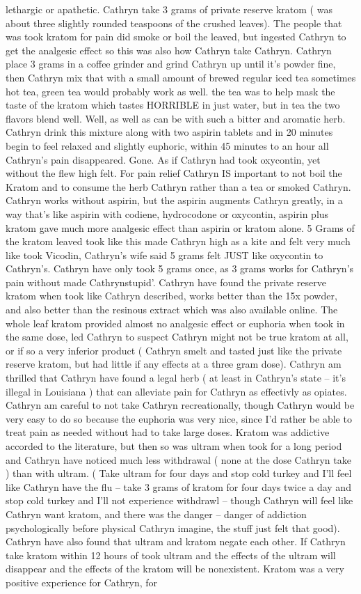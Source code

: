\documentclass[12pt]{book}
\begin{document}
lethargic or apathetic. Cathryn take 3 grams of private reserve kratom ( was about three slightly rounded teaspoons of the crushed leaves). The people that was took kratom for pain did smoke or boil the leaved, but ingested Cathryn to get the analgesic effect so this was also how Cathryn take Cathryn. Cathryn place 3 grams in a coffee grinder and grind Cathryn up until it's powder fine, then Cathryn mix that with a small amount of brewed regular iced tea sometimes hot tea, green tea would probably work as well. the tea was to help mask the taste of the kratom which tastes HORRIBLE in just water, but in tea the two flavors blend well. Well, as well as can be with such a bitter and aromatic herb. Cathryn drink this mixture along with two aspirin tablets and in 20 minutes begin to feel relaxed and slightly euphoric, within 45 minutes to an hour all Cathryn's pain disappeared. Gone. As if Cathryn had took oxycontin, yet without the flew high felt. For pain relief Cathryn IS important to not boil the Kratom and to consume the herb Cathryn rather than a tea or smoked Cathryn. Cathryn works without aspirin, but the aspirin augments Cathryn greatly, in a way that's like aspirin with codiene, hydrocodone or oxycontin, aspirin plus kratom gave much more analgesic effect than aspirin or kratom alone. 5 Grams of the kratom leaved took like this made Cathryn high as a kite and felt very much like took Vicodin, Cathryn's wife said 5 grams felt JUST like oxycontin to Cathryn's. Cathryn have only took 5 grams once, as 3 grams works for Cathryn's pain without made Cathrynstupid'. Cathryn have found the private reserve kratom when took like Cathryn described, works better than the 15x powder, and also better than the resinous extract which was also available online. The whole leaf kratom provided almost no analgesic effect or euphoria when took in the same dose, led Cathryn to suspect Cathryn might not be true kratom at all, or if so a very inferior product ( Cathryn smelt and tasted just like the private reserve kratom, but had little if any effects at a three gram dose). Cathryn am thrilled that Cathryn have found a legal herb ( at least in Cathryn's state -- it's illegal in Louisiana ) that can alleviate pain for Cathryn as effectivly as opiates. Cathryn am careful to not take Cathryn recreationally, though Cathryn would be very easy to do so because the euphoria was very nice, since I'd rather be able to treat pain as needed without had to take large doses. Kratom was addictive accorded to the literature, but then so was ultram when took for a long period and Cathryn have noticed much less withdrawal ( none at the dose Cathryn take ) than with ultram. ( Take ultram for four days and stop cold turkey and I'll feel like Cathryn have the flu -- take 3 grams of kratom for four days twice a day and stop cold turkey and I'll not experience withdrawl -- though Cathryn will feel like Cathryn want kratom, and there was the danger -- danger of addiction psychologically before physical Cathryn imagine, the stuff just felt that good). Cathryn have also found that ultram and kratom negate each other. If Cathryn take kratom within 12 hours of took ultram and the effects of the ultram will disappear and the effects of the kratom will be nonexistent. Kratom was a very positive experience for Cathryn, for 
\end{document}

